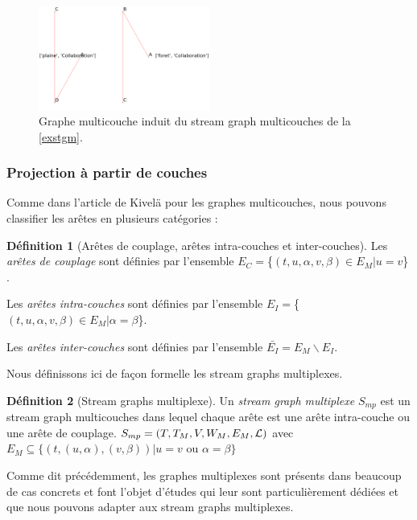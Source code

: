 \documentclass[11pt,a4paper]{article}
\theoremstyle{definition}
\newtheorem{defn}{Définition}
\theoremstyle{remark}
\theoremstyle{remark}
\def \stg {stream graph}
\def \Stgs {Stream graphs}
\def \stgm {stream graph multicouches}
\def \stgs {stream graphs}
\begin{document}
    \begin{figure}[H]
    	\centering
    	\includegraphics[width=0.5\textwidth]{extrt010.png}
    	\caption{Graphe multicouche induit du \stgm{} de la \cref{exstgm}.}
    	\label{induitee}
    \end{figure}
	


\subsubsection{Projection à partir de couches}
Comme dans l'article de Kivelä\cite{mlkiv} pour les graphes multicouches, nous pouvons classifier les arêtes en plusieurs catégories :
	
	\begin{defn}[Arêtes de couplage, arêtes intra-couches et inter-couches]

   	Les {\em arêtes de couplage} sont définies par l'ensemble $E_C=${\Large\{}$(t,u,\alpha,v,\beta)\in E_M | u=v${\Large\} }.

    Les {\em arêtes intra-couches} sont définies par l'ensemble $E_I = ${\Large\{}$(t,u,\alpha,v,\beta) \in E_M | \alpha = \beta ${\Large\}}.

    Les {\em arêtes inter-couches} sont définies par l'ensemble $\bar{E_I} = E_M\backslash E_I$.
    
	
	\end{defn}	
	
	
	Nous définissons ici de façon formelle les \stgs{} multiplexes.
	
	\begin{defn}[\Stgs{} multiplexe]	
	Un {\em \stg{} multiplexe} $S_{mp}$ est un \stgm{} dans lequel chaque arête est une arête intra-couche ou une arête de couplage. $S_{mp}= (T,T_M,V,W_M,E_M,{\cal L})$ avec $E_M \subseteq \{(t,(u,\alpha),(v,\beta)) | u = v \text{ ou } \alpha=\beta \}$
	\end{defn}
	
	Comme dit précédemment, les graphes multiplexes sont présents dans beaucoup de cas concrets et font l'objet d'études qui leur sont particulièrement dédiées et que nous pouvons adapter aux \stgs{} multiplexes. 
\end{document}
